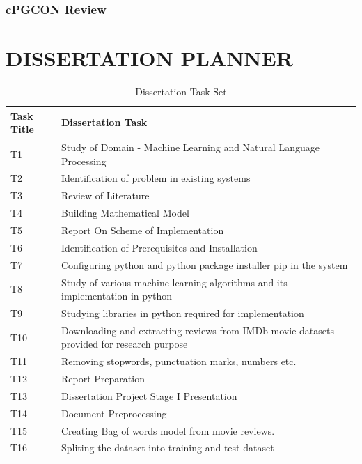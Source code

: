 \documentclass[oneside,a4paper,12pt]{pictreport}
\begin{document}
\subsection{cPGCON Review}

\chapter{DISSERTATION PLANNER}
\renewcommand{\arraystretch}{1.5}
\begin{table}[]
\centering
\caption{Dissertation Task Set}
\label{my-label}
\begin{tabular}{|l|l|}
\hline
\textbf{Task Title} & \textbf{Dissertation Task}                    \\ \hline
T1                  & Study of Domain - Machine Learning and Natural Language Processing         \\ \hline
T2                  & Identification of problem in existing systems \\ \hline
T3                  & Review of Literature \\ 
\hline
T4                  & Building Mathematical Model \\ 
\hline
T5                  & Report On Scheme of Implementation \\ \hline
T6                  & Identification of Prerequisites and Installation \\ \hline
T7                  & Configuring python and python package installer pip in the system \\ \hline
T8                  & Study of various machine learning algorithms and its implementation in python\\ \hline
T9                  & Studying libraries in python required for implementation \\ \hline
T10                  & Downloading and extracting reviews from IMDb movie datasets provided for research purpose \\ \hline
T11                  & Removing stopwords, punctuation marks, numbers etc.\\ \hline
T12                  & Report Preparation \\ \hline
T13                  & Dissertation Project Stage I Presentation \\ \hline
T14                  & Document Preprocessing
 \\ \hline
T15                  & Creating Bag of words model from movie reviews.
 \\ \hline
T16                  & Spliting the dataset into training and test dataset \\ \hline

\end{tabular}
\end{table}
\end{document}
